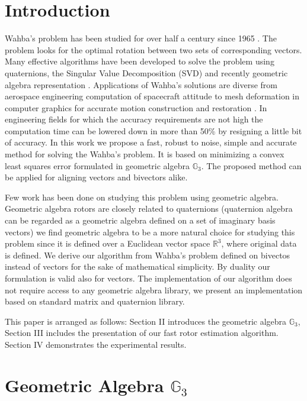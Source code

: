 \documentclass{birkjour}
\numberwithin{equation}{section}
\begin{document}
\section{Introduction}

\indent Wahba's problem has been studied for over half a century since 1965 \cite{Wahba1965}. The problem looks for the optimal rotation between two sets of corresponding vectors. Many effective algorithms have been developed to solve the problem \cite{Arun1987, Horn1987, Mortari1996, Shuster1981, Wu2017, Yang2015} using quaternions, the Singular Value Decomposition (SVD) and recently geometric algebra representation \cite{Perwass2009, Dorst2011}. Applications of Wahba's solutions are diverse from aerospace engineering computation of spacecraft attitude \cite{Wu2017} to mesh deformation in computer graphics \cite{Sorkine2007, Sin2013} for accurate motion construction and restoration \cite{Nieto2012, Perwass2009}. 
In engineering fields for which the accuracy requirements are not high the computation time can be lowered down in more than 50\% by resigning a little bit of accuracy. In this work we propose a fast, robust to noise, simple and accurate method for solving the Wahba's problem. It is based on minimizing a convex least squares error formulated in geometric algebra $\mathbb{G}_3$. The proposed method can be applied for aligning vectors and bivectors alike.

Few work has been done on studying this problem using geometric algebra. Geometric algebra rotors are closely related to quaternions (quaternion algebra can be regarded as a geometric algebra defined on a set of imaginary basis vectors) we find geometric algebra to be a more natural choice for studying this problem since it is defined over a Euclidean vector space $\mathbb R^3$, where original data is defined. We derive our algorithm from Wahba's problem defined on bivectos instead of vectors for the sake of mathematical simplicity. By duality our formulation is valid also for vectors. The implementation of our algorithm does not require access to any geometric algebra library, we present an implementation based on standard matrix and quaternion library. 

\indent This paper is arranged as follows: Section II introduces the geometric algebra $\mathbb{G}_3$, Section III includes the presentation of our fast rotor estimation algorithm. Section IV demonstrates the experimental results.

\section{Geometric Algebra $\mathbb{G}_3$}
\end{document}
